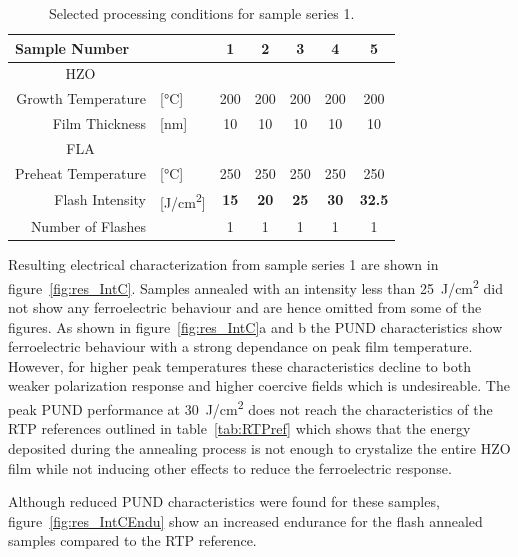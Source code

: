 \documentclass[11pt,twoside]{eitExjobb}
\begin{document}
\begin{table}[htbp]
    \centering
    \caption{Selected processing conditions for sample series 1.}\label{tab:FlashIntC}
    \begin{tabular}{rlccccc}
        \toprule
        \multicolumn{2}{l}{Sample Number} & 1 & 2 & 3 & 4 & 5 \\\midrule
        \multicolumn{1}{c}{HZO} & & & & & & \\
        Growth Temperature & [\si{\celsius}] & 200 & 200 & 200 & 200 & 200 \\
        Film Thickness & [\si{\nano\meter}] & 10 & 10 & 10 & 10 & 10 \\\midrule
        \multicolumn{1}{c}{FLA} & & & & & & \\
        Preheat Temperature & [\si{\celsius}] & 250 & 250 & 250 & 250 & 250 \\
        Flash Intensity & [\si{\joule/\centi\meter^2}] & \textbf{15} & \textbf{20} & \textbf{25} & \textbf{30} & \textbf{32.5} \\
        Number of Flashes & & 1 & 1 & 1 & 1 & 1 \\\bottomrule
    \end{tabular}
\end{table}

Resulting electrical characterization from sample series 1 are shown in
figure~\ref{fig:res_IntC}. Samples annealed with an intensity less than
\SI{25}{\joule/\centi\meter^2} did not show any ferroelectric behaviour and are
hence omitted from some of the figures. As shown in
figure~\ref{fig:res_IntC}a and b the PUND characteristics show
ferroelectric behaviour with a strong dependance on peak film temperature.
However, for higher peak temperatures these characteristics decline to both
weaker polarization response and higher coercive fields which is undesireable.
The peak PUND performance at \SI{30}{\joule/\centi\meter^2} does not reach the
characteristics of the RTP references outlined in table~\ref{tab:RTPref} which
shows that the energy deposited during the annealing process is not enough to
crystalize the entire HZO film while not inducing other effects to reduce the
ferroelectric response.

Although reduced PUND characteristics were found for these samples,
figure~\ref{fig:res_IntCEndu} show an increased endurance for the flash
annealed samples compared to the RTP reference.
\end{document}
